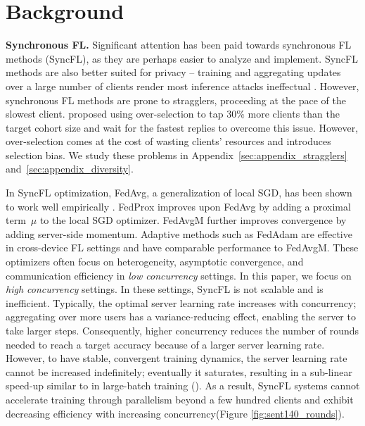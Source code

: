 \documentclass[twoside]{article}
\newcommand{\kshitiz}[1]{\todo[color=red!20,size=\footnotesize,inline,caption={}]{KM: #1}{}}
\newcommand{\concurrency}{{concurrency}\xspace}
\newcommand{\syncfl}{{SyncFL}\xspace}
\begin{document}
\section{Background}
\label{sec:background}
\textbf{Synchronous FL. }
Significant attention has been paid towards synchronous FL methods (\syncfl), as they are perhaps easier to
analyze and implement. \syncfl methods are also better suited for privacy -- training and aggregating updates over a large number of clients render most inference attacks ineffectual \citep{melis2019exploiting, zhu2020deep, geiping2020inverting, lam2021gradient}. However, synchronous FL methods are prone to stragglers, proceeding at the pace of the slowest client. \cite{google-fl} proposed using over-selection to tap 30\% more clients than the target cohort size and wait for the fastest replies to overcome this issue. However, over-selection comes at the cost of wasting clients' resources and introduces selection bias. We study these problems in Appendix~\ref{sec:appendix_stragglers} and~\ref{sec:appendix_diversity}.

In \syncfl optimization, FedAvg, a generalization of local SGD, has been shown to work well empirically \citep{google-fedavg}. FedProx \citep{fedprox} improves upon FedAvg by adding a proximal term~$\mu$ to the local SGD optimizer. FedAvgM \citep{fedavgm} further improves convergence by adding server-side momentum. Adaptive methods such as FedAdam \citep{adaptive-fl-optimization} are effective in cross-device FL settings and have comparable performance to FedAvgM. These optimizers often focus on heterogeneity, asymptotic convergence, and communication efficiency in \emph{low \concurrency} settings. In this paper, we focus on \emph{high \concurrency} settings. In these settings, \syncfl is not scalable and is inefficient. Typically, the optimal server learning rate increases with \concurrency{}; aggregating over more users has a variance-reducing effect, enabling the server to take larger steps. Consequently, higher \concurrency reduces the number of rounds needed to reach a target accuracy because of a larger server learning rate. However, to have stable, convergent training dynamics, the server learning rate cannot be increased indefinitely; eventually it saturates, resulting in a sub-linear speed-up similar to in large-batch training (\cite{imagenet-1hr, scaling_nmt, bert_in_76, imagenet_minutes, lars, measuring_data_parallelism}). 
As a result, \syncfl systems cannot accelerate training through parallelism beyond a few hundred clients and exhibit decreasing efficiency with increasing \concurrency (Figure \ref{fig:sent140_rounds}). 
\end{document}
